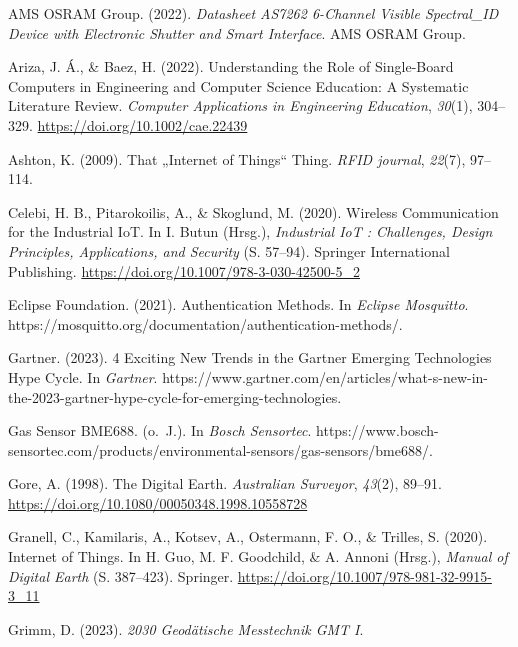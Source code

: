 \documentclass[
  11pt,
  a4paperpaper,
  oneside, openany  ,captions=tableheading
]{scrbook}
\newlength{\cslhangindent}
\newenvironment{CSLReferences}[2] %
  {\begin{list}{}{%
   \setlength{\itemindent}{0pt}
   \setlength{\leftmargin}{0pt}
   \setlength{\parsep}{0pt}
   \ifodd #1
    \setlength{\leftmargin}{\cslhangindent}
    \setlength{\itemindent}{-1\cslhangindent}
   \fi
   \setlength{\itemsep}{#2\baselineskip}}}
  {\end{list}}
\theoremstyle{definition}
\theoremstyle{remark}
\begin{document}
\label{refs}
\begin{CSLReferences}{1}{0}
AMS OSRAM Group. (2022). \emph{Datasheet {AS7262} 6-{Channel Visible
Spectral}\_{ID Device} with {Electronic Shutter} and {Smart Interface}}.
AMS OSRAM Group.

Ariza, J. Á., \& Baez, H. (2022). Understanding the Role of Single-Board
Computers in Engineering and Computer Science Education: {A} Systematic
Literature Review. \emph{Computer Applications in Engineering
Education}, \emph{30}(1), 304--329.
\url{https://doi.org/10.1002/cae.22439}

Ashton, K. (2009). That {„Internet of Things``} Thing. \emph{RFID
journal}, \emph{22}(7), 97--114.

Celebi, H. B., Pitarokoilis, A., \& Skoglund, M. (2020). Wireless
{Communication} for the {Industrial IoT}. In I. Butun (Hrsg.),
\emph{Industrial {IoT} : {Challenges}, {Design Principles},
{Applications}, and {Security}} (S. 57--94). Springer International
Publishing. \url{https://doi.org/10.1007/978-3-030-42500-5_2}

Eclipse Foundation. (2021). Authentication Methods. In \emph{Eclipse
Mosquitto}. https://mosquitto.org/documentation/authentication-methods/.

Gartner. (2023). 4 {Exciting New Trends} in the {Gartner Emerging
Technologies Hype Cycle}. In \emph{Gartner}.
https://www.gartner.com/en/articles/what-s-new-in-the-2023-gartner-hype-cycle-for-emerging-technologies.

Gas Sensor {BME688}. (o.~J.). In \emph{Bosch Sensortec}.
https://www.bosch-sensortec.com/products/environmental-sensors/gas-sensors/bme688/.

Gore, A. (1998). The {Digital Earth}. \emph{Australian Surveyor},
\emph{43}(2), 89--91.
\url{https://doi.org/10.1080/00050348.1998.10558728}

Granell, C., Kamilaris, A., Kotsev, A., Ostermann, F. O., \& Trilles, S.
(2020). Internet of {Things}. In H. Guo, M. F. Goodchild, \& A. Annoni
(Hrsg.), \emph{Manual of {Digital Earth}} (S. 387--423). Springer.
\url{https://doi.org/10.1007/978-981-32-9915-3_11}

Grimm, D. (2023). \emph{2030 {Geod{ä}tische Messtechnik GMT I}}.


\end{CSLReferences}
\end{document}
